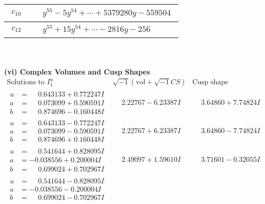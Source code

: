 \documentclass[1p]{elsarticle_modified}
\theoremstyle{definition}
\newcommand{\I}{\sqrt{-1}}
\begin{document}
\begin{tabular}{m{50pt}|m{274pt}}
\hline $$\begin{aligned}c_{10}\end{aligned}$$&$\begin{aligned}
&y^{55}-5 y^{54}+\cdots+5379280 y-559504
\end{aligned}$\\
\hline $$\begin{aligned}c_{12}\end{aligned}$$&$\begin{aligned}
&y^{55}+15 y^{54}+\cdots-2816 y-256
\end{aligned}$\\
\hline
\end{tabular}\\~\\
\newpage\flushleft \textbf{(vi) Complex Volumes and Cusp Shapes}
$$\begin{array}{c|c|c}  
\text{Solutions to }I^u_{1}& \I (\text{vol} + \sqrt{-1}CS) & \text{Cusp shape}\\
 \hline 
\begin{aligned}
u &= \phantom{-}0.643133 + 0.772247 I \\
a &= \phantom{-}0.073099 + 0.590591 I \\
b &= \phantom{-}0.874696 - 0.160448 I\end{aligned}
 & \phantom{-}2.22767 - 6.23387 I & \phantom{-}3.64860 + 7.74824 I \\ \hline\begin{aligned}
u &= \phantom{-}0.643133 - 0.772247 I \\
a &= \phantom{-}0.073099 - 0.590591 I \\
b &= \phantom{-}0.874696 + 0.160448 I\end{aligned}
 & \phantom{-}2.22767 + 6.23387 I & \phantom{-}3.64860 - 7.74824 I \\ \hline\begin{aligned}
u &= \phantom{-}0.541644 + 0.828095 I \\
a &= -0.038556 + 0.200004 I \\
b &= \phantom{-}0.699024 + 0.702967 I\end{aligned}
 & \phantom{-}2.49097 + 1.59610 I & \phantom{-}3.71601 - 0.32055 I \\ \hline\begin{aligned}
u &= \phantom{-}0.541644 - 0.828095 I \\
a &= -0.038556 - 0.200004 I \\
b &= \phantom{-}0.699024 - 0.702967 I\end{aligned}

\end{array}$$
\end{document}
